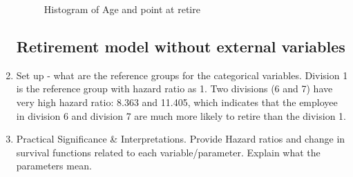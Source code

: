 \documentclass[12pt,letterpaper]{article}
\begin{document}
\begin{enumerate}
\begin{figure}[h!]
	\centering
	\caption{Histogram of Age and point at retire}
	\label{fig:hist}
\end{figure}
\subsection{Retirement model without external variables}
\item Set up - what are the reference groups for the categorical variables.  Division 1 is the reference group with hazard ratio as 1. Two divisions (6 and 7) have very high hazard ratio: 8.363 and 11.405, which indicates that the employee in division 6 and division 7 are much more likely to retire than the division 1.
\item Practical Significance \& Interpretations.  Provide Hazard ratios and change in survival functions related to each variable/parameter.  Explain what the parameters mean.


\end{enumerate}
\end{document}
